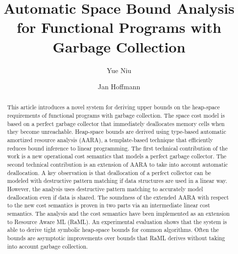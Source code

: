 \documentclass{easychair}
\title{Automatic Space Bound Analysis for Functional Programs with Garbage Collection}
\author{
Yue Niu
\and
Jan Hoffmann
}
\institute{
  Carnegie Mellon University,
  Pittsburgh, PA, United States\\
  \email{\{yuen,jhoffmann\}@cs.cmu.edu}
 }
\theoremstyle{definition}
\begin{document}
\maketitle

\begin{abstract}
  This article introduces a novel system for deriving upper bounds on
  the heap-space requirements of functional programs with garbage
  collection.
  The space cost model is based on a perfect garbage collector that
  immediately deallocates memory cells when they become unreachable.
  Heap-space bounds are derived using type-based automatic amortized
  resource analysis (AARA), a template-based technique that
  efficiently reduces bound inference to linear programming.
	The first technical contribution of the work is a new operational cost
  semantics that models a perfect garbage collector.
  The second technical contribution is an extension of AARA
  to take into account automatic deallocation. A key observation is
  that deallocation of a perfect collector can be modeled with
  destructive pattern matching if data structures are used in a linear
  way. However, the analysis uses destructive pattern matching to
  accurately model deallocation even if data is shared.
  The soundness of the extended AARA with respect to the new cost semantics 
	is proven in two parts via an intermediate linear cost semantics.
  The analysis and the cost semantics have been implemented as an
  extension to Resource Aware ML (RaML). An experimental evaluation
  shows that the system is able to derive tight symbolic heap-space
  bounds for common algorithms. Often the bounds are asymptotic
  improvements over bounds that RaML derives without taking into
  account garbage collection.
\end{abstract}


\setcounter{tocdepth}{3}
{\small
\tableofcontents}

%
%

\end{document}
